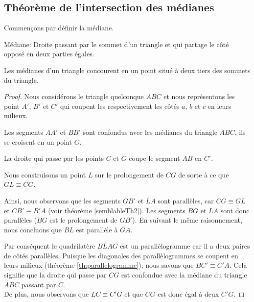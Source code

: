 \documentclass[a4paper,12pt]{article}
\begin{document}
\pagebreak
\subsection{Théorème de l'intersection des médianes}
Commençons par définir la médiane.
\begin{definition}{Médiane:}
Droite passant par le sommet d'un triangle et qui partage le côté opposé en deux parties égales.
\end{definition}

\begin{theorem}
Les médianes d'un triangle concourent en un point situé à deux tiers des sommets du triangle.
\end{theorem}

\begin{proof}
Nous considérons le triangle quelconque $ABC$ et nous représentons les point $A'$, $B'$ et $C'$ qui coupent les respectivement les côtés $a$, $b$ et $c$ en leurs milieux. 
\begin{hyp}
Les segments $AA'$ et $BB'$ sont confondus avec les médianes du triangle $ABC$, ils se croisent en un point $G$.
\end{hyp}
\begin{concl}
La droite qui passe par les points $C$ et $G$ coupe le segment $AB$ en $C'$.
\end{concl}

Nous construisons un point $L$ sur le prolongement de $CG$ de sorte à ce que $GL \equiv CG$.


Ainsi, nous observons que les segments $GB'$ et $LA$ sont parallèles, car $CG \equiv GL$ et $CB' \equiv B'A$ (voir théorème \ref{semblableTh2}). Les segments $BG$ et $LA$ sont donc parallèles ($BG$ est le prolongement de $GB'$). En suivant le même raisonnement, nous concluons que $BL$ est parallèle à $GA$. 


Par conséquent le quadrilatère $BLAG$ est un parallèlogramme car il a deux paires de côtés parallèles. Puisque les diagonales des parallèlogrammes se coupent en leurs milieux (théorème \ref{th:parallelogramme}), nous savons que $BC' \equiv C'A$. Cela signifie que la droite qui passe par $CG$ est confondue avec la médiane du triangle $ABC$ passant par $C$.\\


De plus, nous observons que $LC \equiv C'G$  et que $CG$ est donc égal à deux $C'G$.
\end{proof}
\end{document}
